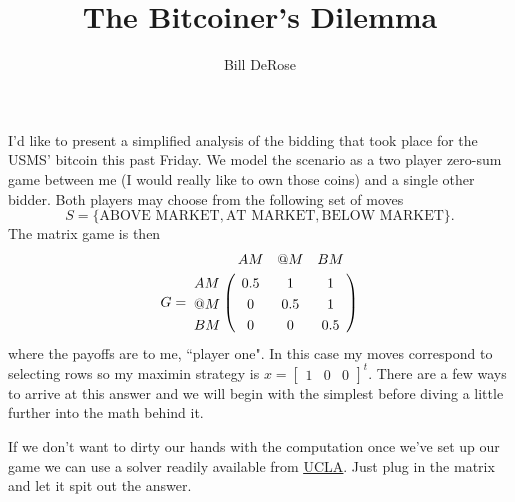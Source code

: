 \documentclass[11pt, oneside]{article}     %
\title{The Bitcoiner's Dilemma}
\author{Bill DeRose}
\begin{document}

\maketitle
I'd like to present a simplified analysis of the bidding that took place for the 
USMS' bitcoin this past Friday. We model the scenario as a two player 
zero-sum game between me (I would really like to own those coins) 
and a single other bidder. Both players may choose from the following set of 
moves $$S =\{\mbox{ABOVE MARKET}, \mbox{AT MARKET}, \mbox{BELOW MARKET}\}.$$
The matrix game is then 
\begin{align*}
G = \bordermatrix{
      &   AM & @M & BM\cr
      AM & 0.5 & 1 & 1\cr
    	@M & 0 & 0.5 & 1\cr
			BM & 0 & 0 & 0.5\cr}
\end{align*}
where the payoffs are to me, ``player one". In this case my moves correspond to 
selecting rows so 
my maximin strategy is $x = \begin{bmatrix}1 & 0 & 0 \end{bmatrix}^t$. 
There are a few ways to arrive at this answer and we will begin with
the simplest before diving a little further into the math behind it.


If we don't want to dirty our hands with the computation once we've set
up our game we can use a solver readily available from
\href{http://www.math.ucla.edu/~tom/gamesolve.html}{\uline{UCLA}}. Just plug in the
matrix and let it spit out the answer.
\end{document}
